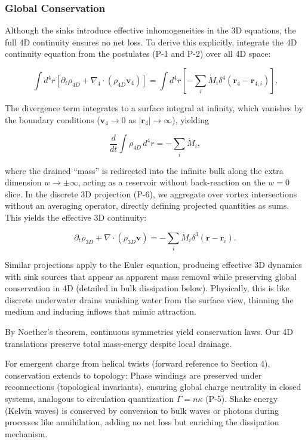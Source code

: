 \subsubsection{Global Conservation}
Although the sinks introduce effective inhomogeneities in the 3D equations, the full 4D continuity ensures no net loss. To derive this explicitly, integrate the 4D continuity equation from the postulates (P-1 and P-2) over all 4D space:

\begin{equation}
\int d^4 r \left[ \partial_t \rho_{4D} + \nabla_4 \cdot (\rho_{4D} \mathbf{v}_4) \right] = \int d^4 r \left[ -\sum_i \dot{M}_i \delta^4(\mathbf{r}_4 - \mathbf{r}_{4,i}) \right].
\end{equation}

The divergence term integrates to a surface integral at infinity, which vanishes by the boundary conditions ($\mathbf{v}_4 \to 0$ as $|\mathbf{r}_4| \to \infty$), yielding

\begin{equation}
\frac{d}{dt} \int \rho_{4D} \, d^4 r = -\sum_i \dot{M}_i,
\end{equation}

where the drained ``mass'' is redirected into the infinite bulk along the extra dimension $w \to \pm \infty$, acting as a reservoir without back-reaction on the $w=0$ slice. In the discrete 3D projection (P-6), we aggregate over vortex intersections without an averaging operator, directly defining projected quantities as sums. This yields the effective 3D continuity:

\begin{equation}
\partial_t \rho_{3D} + \nabla \cdot (\rho_{3D} \mathbf{v}) = -\sum_i \dot{M}_i \delta^3(\mathbf{r} - \mathbf{r}_i).
\end{equation}

Similar projections apply to the Euler equation, producing effective 3D dynamics with sink sources that appear as apparent mass removal while preserving global conservation in 4D (detailed in bulk dissipation below). Physically, this is like discrete underwater drains vanishing water from the surface view, thinning the medium and inducing inflows that mimic attraction.

By Noether's theorem, continuous symmetries yield conservation laws. Our 4D translations preserve total mass-energy despite local drainage.

For emergent charge from helical twists (forward reference to Section 4), conservation extends to topology: Phase windings are preserved under reconnections (topological invariants), ensuring global charge neutrality in closed systems, analogous to circulation quantization $\Gamma = n \kappa$ (P-5). Shake energy (Kelvin waves) is conserved by conversion to bulk waves or photons during processes like annihilation, adding no net loss but enriching the dissipation mechanism.

